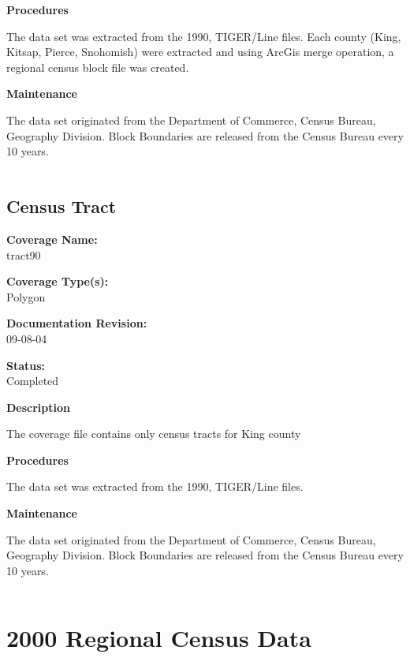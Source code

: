 {\bf \large Procedures}

The data set was extracted from the 1990, TIGER/Line files. Each
county (King, Kitsap, Pierce, Snohomish) were extracted and using
ArcGis merge operation, a regional census block file was created.

{\bf \large Maintenance}

The data set originated from the Department of Commerce, Census
Bureau, Geography Division. Block Boundaries are released from the
Census Bureau every 10 years.

\begin{landscape}
\begin{longtable}{llrrrrrc}

\end{longtable}
\end{landscape}
\newpage

\subsection{Census Tract}

{\bf \large Coverage Name:}\\
tract90

{\bf \large Coverage Type(s):}\\
Polygon

{\bf \large Documentation Revision:}\\
09-08-04

{\bf \large Status:}\\
Completed

{\bf \large Description}

The coverage file contains only census tracts for King county

{\bf \large Procedures}

The data set was extracted from the 1990, TIGER/Line files.

{\bf \large Maintenance}

The data set originated from the Department of Commerce, Census
Bureau, Geography Division. Block Boundaries are released from the
Census Bureau every 10 years.

\begin{landscape}
\begin{longtable}{llrrrrrc}

\end{longtable}
\end{landscape}
\newpage

\section{2000 Regional Census Data}
